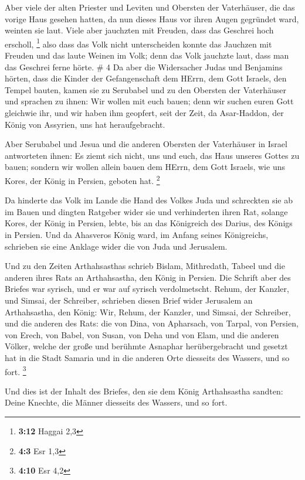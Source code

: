  Aber viele der alten Priester und Leviten und Obersten der
Vaterhäuser, die das vorige Haus gesehen hatten, da nun dieses Haus vor
ihren Augen gegründet ward, weinten sie laut. Viele aber jauchzten mit
Freuden, dass das Geschrei hoch erscholl, \footnote{\textbf{3:12} Haggai
  2,3}  also dass das Volk nicht unterscheiden konnte das
Jauchzen mit Freuden und das laute Weinen im Volk; denn das Volk
jauchzte laut, dass man das Geschrei ferne hörte. \# 4  Da
aber die Widersacher Judas und Benjamins hörten, dass die Kinder der
Gefangenschaft dem HErrn, dem Gott Israels, den Tempel bauten,
 kamen sie zu Serubabel und zu den Obersten der Vaterhäuser
und sprachen zu ihnen: Wir wollen mit euch bauen; denn wir suchen euren
Gott gleichwie ihr, und wir haben ihm geopfert, seit der Zeit, da
Asar-Haddon, der König von Assyrien, uns hat heraufgebracht.

 Aber Serubabel und Jesua und die anderen Obersten der
Vaterhäuser in Israel antworteten ihnen: Es ziemt sich nicht, uns und
euch, das Haus unseres Gottes zu bauen; sondern wir wollen allein bauen
dem HErrn, dem Gott Israels, wie uns Kores, der König in Persien,
geboten hat. \footnote{\textbf{4:3} Esr 1,3}

 Da hinderte das Volk im Lande die Hand des Volkes Juda und
schreckten sie ab im Bauen  und dingten Ratgeber wider sie
und verhinderten ihren Rat, solange Kores, der König in Persien, lebte,
bis an das Königreich des Darius, des Königs in Persien. 
Und da Ahasveros König ward, im Anfang seines Königreichs, schrieben sie
eine Anklage wider die von Juda und Jerusalem.

 Und zu den Zeiten Arthahsasthas schrieb Bislam, Mithredath,
Tabeel und die anderen ihres Rats an Arthahsastha, den König in Persien.
Die Schrift aber des Briefes war syrisch, und er war auf syrisch
verdolmetscht.  Rehum, der Kanzler, und Simsai, der
Schreiber, schrieben diesen Brief wider Jerusalem an Arthahsastha, den
König:  Wir, Rehum, der Kanzler, und Simsai, der Schreiber,
und die anderen des Rats: die von Dina, von Apharsach, von Tarpal, von
Persien, von Erech, von Babel, von Susan, von Deha und von Elam,
 und die anderen Völker, welche der große und berühmte
Asnaphar herübergebracht und gesetzt hat in die Stadt Samaria und in die
anderen Orte diesseits des Wassers, und so fort. \footnote{\textbf{4:10}
  Esr 4,2}

 Und dies ist der Inhalt des Briefes, den sie dem König
Arthahsastha sandten: Deine Knechte, die Männer diesseits des Wassers,
und so fort.

